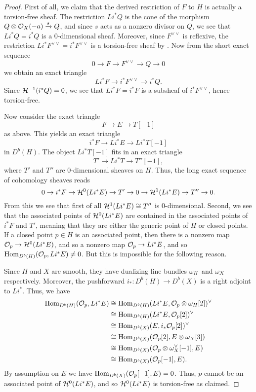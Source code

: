 \documentclass[letterpaper,12pt]{amsart}
\theoremstyle{remark}
\begin{document}
\begin{proof}
First of all, we claim that the derived restriction of $F$ to $H$ is actually a torsion-free sheaf. The restriction $Li^* Q$ is the cone of the morphism $Q \otimes \mathcal{O}_X(-a) \xrightarrow{s} Q$, and since $s$ acts as a nonzero divisor on $Q$, we see that $L i^* Q = i^* Q$ is a 0-dimensional sheaf. Moreover, since $F^{\vee\vee}$ is reflexive, the restriction $L i^* F^{\vee\vee} = i^* F^{\vee\vee}$ is a torsion-free sheaf by \cite[Corollary 1.1.14]{HL}. Now from the short exact sequence
\[ 0 \to F \to F^{\vee\vee} \to Q \to 0 \]
we obtain an exact triangle
\[ L i^* F \to i^* F^{\vee\vee} \to i^*Q. \]
Since $\mathcal{H}^{-1}(i^* Q) = 0$, we see that $L i^* F = i^* F$ is a subsheaf of $i^* F^{\vee\vee}$, hence torsion-free.

Now consider the exact triangle
\[ F \to E \to T[-1] \]
as above. This yields an exact triangle
\[ i^*F \to L i^* E \to L i^* T[-1] \]
in $D^b(H)$. The object $L i^* T[-1]$ fits in an exact triangle
\[ T' \to L i^* T \to T''[-1], \]
where $T'$ and $T''$ are 0-dimensional sheaves on $H$. Thus, the long exact sequence of cohomology sheaves reads
\[ 0 \to i^* F \to \mathcal{H}^0(L i^* E) \to T' \to 0 \to \mathcal{H}^1(Li^* E) \to T'' \to 0. \]
From this we see that first of all $\mathcal{H}^1(Li^* E) \cong T''$ is 0-dimensional. Second, we see that the associated points of $\mathcal{H}^0(L i^* E)$ are contained in the associated points of $i^* F$ and $T'$, meaning that they are either the generic point of $H$ or closed points. If a closed point $p \in H$ is an associated point, then there is a nonzero map $\mathcal{O}_p \to \mathcal{H}^0(L i^* E)$, and so a nonzero map $\mathcal{O}_p \to L i^* E$, and so $\mathrm{Hom}_{D^b(H)}(\mathcal{O}_p, L i^* E) \neq 0$. But this is impossible for the following reason.

Since $H$ and $X$ are smooth, they have dualizing line bundles $\omega_H$ and $\omega_X$ respectively. Moreover, the pushforward $i_*: D^b(H) \to D^b(X)$ is a right adjoint to $L i^*$. Thus, we have
\begin{align*}
    \mathrm{Hom}_{D^b(H)}(\mathcal{O}_p, L i^* E) & \cong \mathrm{Hom}_{D^b(H)}(L i^* E, \mathcal{O}_p \otimes \omega_H[2])^\vee \\
    & \cong \mathrm{Hom}_{D^b(H)}(L i^* E, \mathcal{O}_p[2])^\vee \\
    & \cong \mathrm{Hom}_{D^b(X)}(E, i_*\mathcal{O}_p[2])^\vee \\
    & \cong \mathrm{Hom}_{D^b(X)}(\mathcal{O}_p[2], E \otimes \omega_X[3]) \\
    & \cong \mathrm{Hom}_{D^b(X)}(\mathcal{O}_p \otimes \omega_X^\vee[-1], E) \\
    & \cong \mathrm{Hom}_{D^b(X)}(\mathcal{O}_p[-1], E).
\end{align*}
By assumption on $E$ we have $\mathrm{Hom}_{D^b(X)}(\mathcal{O}_p[-1], E) = 0$. Thus, $p$ cannot be an associated point of $\mathcal{H}^0(L i^* E)$, and so $\mathcal{H}^0(L i^* E)$ is torsion-free as claimed.
\end{proof}
\end{document}
